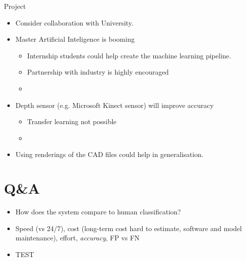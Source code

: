 \documentclass{beamer}
\begin{document}
\begin{frame}{Project} \begin{itemize}
 \item Consider collaboration with University.
 \item Master Artificial Inteligence is booming
  \begin{itemize}
  \item Internship students could help create the machine learning pipeline.
  \item Partnership with industry is highly encouraged
  \item  
  \end{itemize}
 \item Depth sensor (e.g. Microsoft Kinect sensor) will improve accuracy 
  \begin{itemize}
  \item Transfer learning not possible
  \item 
  \end{itemize}
 \item Using renderings of the CAD files could help in generalisation.
\end{itemize}
\end{frame}

\section{Q\&A}
\begin{frame}
  \begin{itemize}
	    \item How does the system compare to human classification?
	    \item Speed (vs 24/7), cost (long-term cost hard to estimate, software and model maintenance), effort, \emph{accuracy}, FP vs FN
	    \item TEST
  \end{itemize}
\end{frame}
\end{document}
